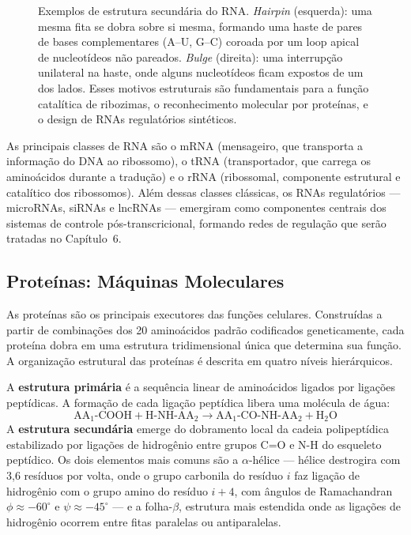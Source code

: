 \begin{figure}[htbp]
\caption{Exemplos de estrutura secundária do RNA. \emph{Hairpin} (esquerda): uma mesma fita se dobra sobre si mesma, formando uma haste de pares de bases complementares (A--U, G--C) coroada por um loop apical de nucleotídeos não pareados. \emph{Bulge} (direita): uma interrupção unilateral na haste, onde alguns nucleotídeos ficam expostos de um dos lados. Esses motivos estruturais são fundamentais para a função catalítica de ribozimas, o reconhecimento molecular por proteínas, e o design de RNAs regulatórios sintéticos.}
\label{fig:01-rna}
\end{figure}

As principais classes de RNA são o mRNA (mensageiro, que transporta a informação do DNA
ao ribossomo), o tRNA (transportador, que carrega os aminoácidos durante a tradução) e o
rRNA (ribossomal, componente estrutural e catalítico dos ribossomos). Além dessas classes
clássicas, os RNAs regulatórios --- microRNAs, siRNAs e lncRNAs --- emergiram como
componentes centrais dos sistemas de controle pós-transcricional, formando redes de
regulação que serão tratadas no Capítulo~6.

\subsection{Proteínas: Máquinas Moleculares}

As proteínas são os principais executores das funções celulares. Construídas a partir de
combinações dos 20 aminoácidos padrão codificados geneticamente, cada proteína dobra em
uma estrutura tridimensional única que determina sua função. A organização estrutural das
proteínas é descrita em quatro níveis hierárquicos.

A \textbf{estrutura primária} é a sequência linear de aminoácidos ligados por ligações
peptídicas. A formação de cada ligação peptídica libera uma molécula de água:
\begin{equation}
\text{AA}_1\text{-COOH} + \text{H-NH-AA}_2 \rightarrow \text{AA}_1\text{-CO-NH-AA}_2 + \text{H}_2\text{O}
\end{equation}
A \textbf{estrutura secundária} emerge do dobramento local da cadeia polipeptídica
estabilizado por ligações de hidrogênio entre grupos C=O e N-H do esqueleto peptídico.
Os dois elementos mais comuns são a $\alpha$-hélice --- hélice destrogira com 3,6 resíduos
por volta, onde o grupo carbonila do resíduo $i$ faz ligação de hidrogênio com o grupo
amino do resíduo $i+4$, com ângulos de Ramachandran $\phi \approx -60^{\circ}$ e $\psi \approx -45^{\circ}$
--- e a folha-$\beta$, estrutura mais estendida onde as ligações de hidrogênio ocorrem entre
fitas paralelas ou antiparalelas.

